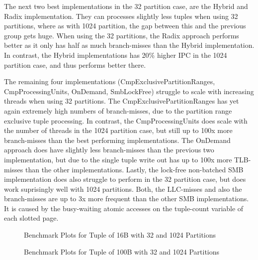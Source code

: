 The next two best implementations in the 32 partition case, are the Hybrid and Radix implementation.
They can processes slightly less tuples when using 32 partitions, where as with 1024 partition, the gap between this and the previous group gets huge.
When using the 32 partitions, the Radix approach performs better as it only has half as much branch-misses than the Hybrid implementation.
In contrast, the Hybrid implementations has 20\% higher \ac{IPC} in the 1024 partition case, and thus performs better there.

The remaining four implementations (CmpExclusivePartitionRanges, CmpProcessingUnits, OnDemand, SmbLockFree) struggle to scale with increasing threads when using 32 partitions.
The CmpExclusivePartitionRanges has yet again extremely high numbers of branch-misses, due to the partition range exclusive tuple processing.
In contrast, the CmpProcessingUnits does scale with the number of threads in the 1024 partition case, but still up to 100x more branch-misses than the best performing implementations.
The OnDemand approach does have slightly less branch-misses than the previous two implementation, but due to the single tuple write out has up to 100x more \ac{TLB}-misses than the other implementations.
Lastly, the lock-free non-batched \ac{SMB} implementation does also struggle to perform in the 32 partition case, but does work suprisingly well with 1024 partitions.
Both, the LLC-misses and also the branch-misses are up to 3x more frequent than the other \ac{SMB} implementations.
It is caused by the busy-waiting atomic accesses on the tuple-count variable of each slotted page.
\begin{figure}[h]
  \centering
  \begin{subfigure}{.49\textwidth}
    \centering
    \resizebox{\linewidth}{!}{}
  \end{subfigure}
  \begin{subfigure}{.49\textwidth}
    \centering
    \resizebox{\linewidth}{!}{}
  \end{subfigure}
  \caption[Shuffle Benchmark Plots for Tuple of 16B with 32 and 1024 Partitions]{Benchmark Plots for Tuple of 16B with 32 and 1024 Partitions}
  \label{plot-shuffle-16B-32-1024}
\end{figure}

\begin{figure}[h]
  \centering
  \begin{subfigure}{.49\textwidth}
    \centering
    \resizebox{\linewidth}{!}{}
  \end{subfigure}
  \begin{subfigure}{.49\textwidth}
    \centering
    \resizebox{\linewidth}{!}{}
  \end{subfigure}
  \caption[Shuffle Benchmark Plots for Tuple of 100B with 32 and 1024 Partitions]{Benchmark Plots for Tuple of 100B with 32 and 1024 Partitions}
  \label{plot-shuffle-100B-32-1024}
\end{figure}

